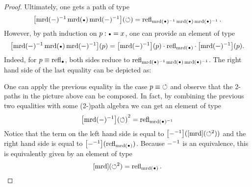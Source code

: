 \documentclass[english,a4paper]{lmcs}
\begin{document}
\begin{proof}
  Ultimately, one gets a path of type
  \begin{displaymath}
    \ap{\inv{\mrd(\blank)} \mrd(\base) \inv{\mrd(\blank)}}(\Sloop) =
    \refl{\inv{\mrd(\base)} \mrd(\base) \inv{\mrd(\base)}}.
  \end{displaymath}
  However, by path induction on $p\from \base = x$, one can provide an
  element of type
  \begin{displaymath}
    \ap{\inv{\mrd(\blank)} \mrd(\base) \inv{\mrd(\blank)}}(p) =
    \ap{\inv{\mrd(\blank)}}(p) \hcomp \refl{\mrd(\base)}
    \hcomp \ap{\inv{\mrd(\blank)}}(p).
  \end{displaymath}
  Indeed, for $p\jdeq \refl{\base}$, both sides reduce to
  $\refl{\inv{\mrd(\base)} \mrd(\base) \inv{\mrd(\base)}}$.
The right hand side of the last equality can be depicted as:

\begin{center}
\end{center}


One can apply the previous equality in the case $p\equiv \mathord{\circlearrowleft}$ and
observe that the 2-paths in the picture above can be composed.
In fact, by combining the previous two equalities
with some (2-)path algebra we can get an element of type
  \begin{displaymath}
    {\ap{\inv{\mrd(\blank)}}(\Sloop)}^2 = \refl{\inv{\mrd(\base)}}
  \end{displaymath}
  Notice that the term on the left hand side is equal to
  $\mathop{\left[{\mathord{{-}}^{-1}}\right]}(\mathop{\left[{\operatorname{\mathrm{mrd}}}\right]} (\mathord{\circlearrowleft}^2))$ and the right hand side is
  equal to $\ap{\inv{\blank}}(\refl{\mrd(\base)})$. Because
  $\mathord{{-}}^{-1}$ is an equivalence, this is equivalently given by an
  element of type
  \begin{displaymath}
    \ap\mrd(\Sloop^2) = \refl{\mrd(\base)}.
  \end{displaymath}


\end{proof}
\end{document}
